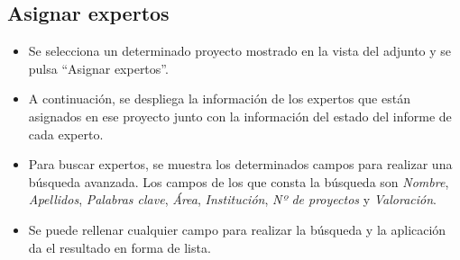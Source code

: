 \documentclass[11pt,a4paper,spanish,twoside]{book}
\begin{document}
\subsection{Asignar expertos}
\begin{itemize}
\item Se selecciona un determinado proyecto mostrado en la vista del adjunto y
  se pulsa ``Asignar expertos''.
\item A continuación, se despliega la información de los expertos que están
  asignados en ese proyecto junto con la información del estado del informe de
  cada experto.
\item Para buscar expertos, se muestra los determinados campos para realizar una
  búsqueda avanzada. Los campos de los que consta la búsqueda son
  \emph{Nombre}, \emph{Apellidos}, \emph{Palabras clave}, \emph{Área},
  \emph{Institución}, \emph{Nº de proyectos} y \emph{Valoración}.
\item Se puede rellenar cualquier campo para realizar la búsqueda y la
  aplicación da el resultado en forma de lista.
\end{itemize}
\end{document}
